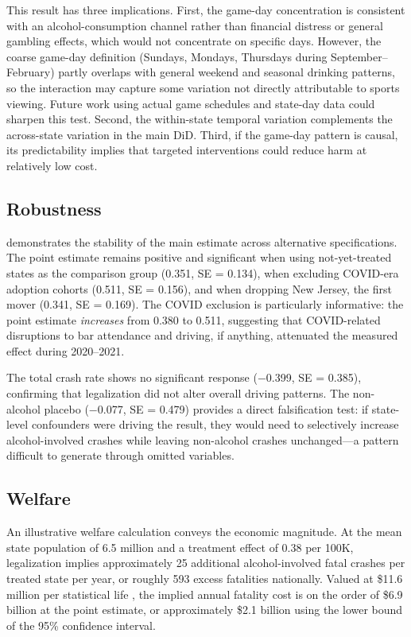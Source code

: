 \documentclass[12pt]{article}
\begin{document}
This result has three implications. First, the game-day concentration is consistent with an alcohol-consumption channel rather than financial distress or general gambling effects, which would not concentrate on specific days. However, the coarse game-day definition (Sundays, Mondays, Thursdays during September--February) partly overlaps with general weekend and seasonal drinking patterns, so the interaction may capture some variation not directly attributable to sports viewing. Future work using actual game schedules and state-day data could sharpen this test. Second, the within-state temporal variation complements the across-state variation in the main DiD. Third, if the game-day pattern is causal, its predictability implies that targeted interventions could reduce harm at relatively low cost.

\subsection{Robustness}



 demonstrates the stability of the main estimate across alternative specifications. The point estimate remains positive and significant when using not-yet-treated states as the comparison group (0.351, SE = 0.134), when excluding COVID-era adoption cohorts (0.511, SE = 0.156), and when dropping New Jersey, the first mover (0.341, SE = 0.169). The COVID exclusion is particularly informative: the point estimate \textit{increases} from 0.380 to 0.511, suggesting that COVID-related disruptions to bar attendance and driving, if anything, attenuated the measured effect during 2020--2021.

The total crash rate shows no significant response ($-$0.399, SE = 0.385), confirming that legalization did not alter overall driving patterns. The non-alcohol placebo ($-$0.077, SE = 0.479) provides a direct falsification test: if state-level confounders were driving the result, they would need to selectively increase alcohol-involved crashes while leaving non-alcohol crashes unchanged---a pattern difficult to generate through omitted variables.

\subsection{Welfare}

An illustrative welfare calculation conveys the economic magnitude. At the mean state population of 6.5 million and a treatment effect of 0.38 per 100K, legalization implies approximately 25 additional alcohol-involved fatal crashes per treated state per year, or roughly 593 excess fatalities nationally. Valued at \$11.6 million per statistical life \citep{USDOT2022}, the implied annual fatality cost is on the order of \$6.9 billion at the point estimate, or approximately \$2.1 billion using the lower bound of the 95\% confidence interval.
\end{document}
